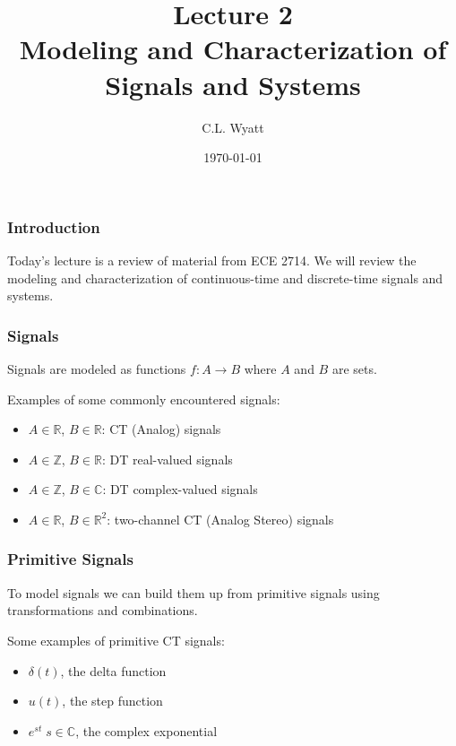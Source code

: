 \documentclass{beamer}
\begin{document}
\title{Lecture 2\\ Modeling and Characterization of Signals and Systems}
\author{C.L. Wyatt}
\date{\today}
\maketitle

\begin{frame}
  \frametitle{Introduction}

  Today's lecture is a review of material from ECE 2714. We will review the modeling and characterization of continuous-time and discrete-time signals and systems.

\end{frame}

\begin{frame}
  \frametitle{Signals}

  Signals are modeled as functions $f: A \rightarrow B$ where $A$ and $B$ are sets.

Examples of some commonly encountered signals:

\begin{itemize}
\item
  $A\in \mathbb{R}$, $B\in \mathbb{R}$: CT (Analog) signals
\item
  $A\in \mathbb{Z}$, $B\in \mathbb{R}$: DT real-valued signals
\item
  $A\in \mathbb{Z}$, $B\in \mathbb{C}$: DT complex-valued signals
\item
  $A\in \mathbb{R}$, $B\in \mathbb{R}^2$: two-channel CT (Analog Stereo) signals
\end{itemize}

\end{frame}

\begin{frame}
  \frametitle{Primitive Signals}

  To model signals we can build them up from primitive signals using transformations and combinations.

Some examples of primitive CT signals:

\begin{itemize}
\item
  $\delta(t)$, the delta function
\item
  $u(t)$, the step function
\item
  $e^{st}\; s\in\mathbb{C}$, the complex exponential
\end{itemize}

\end{frame}
\end{document}
